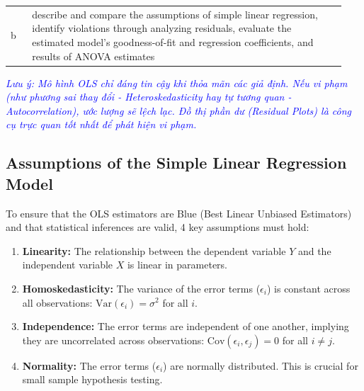 \begin{center}
\begin{tabular}{p{0.06\linewidth} | p{0.88\linewidth}}
	b & describe and compare the assumptions of simple linear regression, identify violations through analyzing residuals, evaluate the estimated model's goodness-of-fit and regression coefficients, and results of ANOVA estimates \\
\end{tabular}
\end{center}

\textcolor{blue}{\textit{Lưu ý: Mô hình OLS chỉ đáng tin cậy khi thỏa mãn các giả định. Nếu vi phạm (như phương sai thay đổi - Heteroskedasticity hay tự tương quan - Autocorrelation), ước lượng sẽ lệch lạc. Đồ thị phần dư (Residual Plots) là công cụ trực quan tốt nhất để phát hiện vi phạm.}}

\subsection{Assumptions of the Simple Linear Regression Model}
To ensure that the OLS estimators are Blue (Best Linear Unbiased Estimators) and that statistical inferences are valid, 4 key assumptions must hold:
\begin{enumerate}
	\item \textbf{Linearity:} The relationship between the dependent variable $Y$ and the independent variable $X$ is linear in parameters.
	\item \textbf{Homoskedasticity:} The variance of the error terms ($\epsilon_i$) is constant across all observations: $\text{Var}(\epsilon_i) = \sigma^2$ for all $i$.
	\item \textbf{Independence:} The error terms are independent of one another, implying they are uncorrelated across observations: $\text{Cov}(\epsilon_i, \epsilon_j) = 0$ for all $i \neq j$.
	\item \textbf{Normality:} The error terms ($\epsilon_i$) are normally distributed. This is crucial for small sample hypothesis testing.
\end{enumerate}

